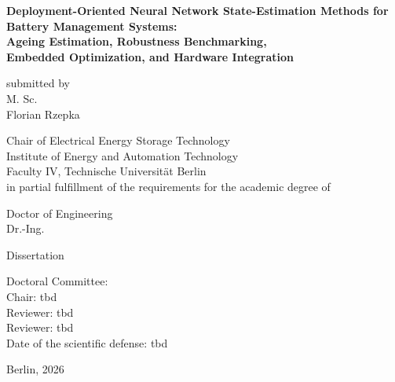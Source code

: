 \documentclass[
    a4paper,
    12pt,
    titlepage,
    bibliography=totoc,
    twoside=on,
    parskip=false,
    numbers=noenddot,
    cleardoublepage=empty,
    DIV=12,
    BCOR=12.0mm,
    headheight=36pt,
    headings=openright
]{scrreprt}
\begin{document}

\begin{titlepage}
\thispagestyle{empty}
\begin{singlespace}
\begin{center}
\vspace*{15pt}
\begin{onehalfspace}
\Huge{\textbf{Deployment-Oriented Neural Network State-Estimation Methods for Battery Management Systems:}}\\
\vspace*{10pt}
\Large{\textbf{Ageing Estimation, Robustness Benchmarking,}}\\
\Large{\textbf{Embedded Optimization, and Hardware Integration}}
\end{onehalfspace}
\vspace*{30pt}
\large{submitted by\\
M. Sc.\\
Florian Rzepka}\\
\vspace*{40pt}

\large{
Chair of Electrical Energy Storage Technology\\
Institute of Energy and Automation Technology\\
Faculty IV, Technische Universit\"at Berlin\\
in partial fulfillment of the requirements for the academic degree of\\}
\vspace{17pt}

\large{
Doctor of Engineering\\
Dr.-Ing.\\
}

\vspace{12pt}
\large{Dissertation\\}
\end{center}

\vspace{36pt}
\begin{flushleft}
\large{Doctoral Committee:\\}
\large{Chair: tbd\\
Reviewer: tbd\\
Reviewer: tbd\\
}
\vspace{10pt}
\large{Date of the scientific defense: tbd\\}
\end{flushleft}
\vspace{10pt}
\begin{center}
\large{Berlin, 2026}
\end{center}
\end{singlespace}
\end{titlepage}
\end{document}

